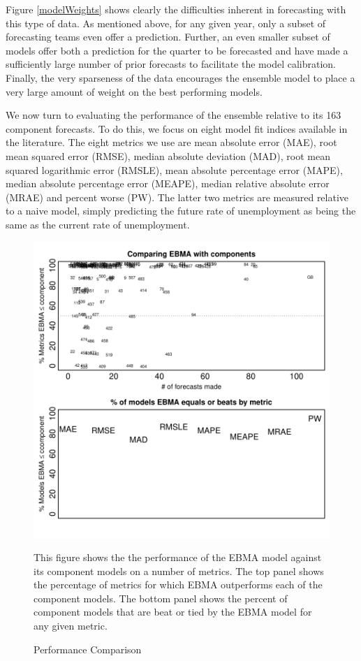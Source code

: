 \documentclass[12pt,fullpage,endnotes]{article}
\begin{document}
Figure \ref{modelWeights} shows clearly the difficulties inherent in
forecasting with this type of data. As mentioned above, for any given year, only a subset
of forecasting teams even offer a prediction.  Further, an even smaller
subset of models offer both a prediction for the quarter to be forecasted and have made a sufficiently large
number of prior forecasts to facilitate the model calibration.  Finally,
the very sparseness of the data encourages the ensemble model to place a very
large amount of weight on the best performing models.

We now turn to evaluating the performance of the ensemble relative to
its 163 component forecasts.  To do this, we focus on eight model fit
indices available in the literature.  The eight metrics we use are
mean absolute error (MAE), root mean squared error (RMSE), median
absolute deviation (MAD), root mean squared logarithmic error (RMSLE), %
mean absolute percentage error (MAPE), median absolute percentage
error (MEAPE), median relative absolute error (MRAE) and percent worse
(PW).  The latter two metrics are measured relative to a naive model,
simply predicting the future rate of unemployment as being the same as
the current rate of unemployment.


\begin{figure}[h]
\caption{Performance Comparison}
\label{compare2Components}
\begin{center}
\includegraphics{compare2Components}
\end{center}

\footnotesize This figure shows the the performance of the EBMA model against its component models on a number of metrics. The top panel shows the percentage of metrics for which EBMA outperforms each of the component models. The bottom panel shows the percent of component models that are beat or tied by the EBMA model for any given metric. 

\end{figure}
\end{document}
